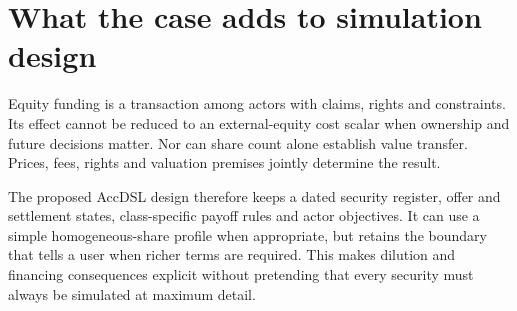 \section{What the case adds to simulation design}
Equity funding is a transaction among actors with claims, rights and constraints. Its effect cannot be reduced to an external-equity cost scalar when ownership and future decisions matter. Nor can share count alone establish value transfer. Prices, fees, rights and valuation premises jointly determine the result.

The proposed AccDSL design therefore keeps a dated security register, offer and settlement states, class-specific payoff rules and actor objectives. It can use a simple homogeneous-share profile when appropriate, but retains the boundary that tells a user when richer terms are required. This makes dilution and financing consequences explicit without pretending that every security must always be simulated at maximum detail.
